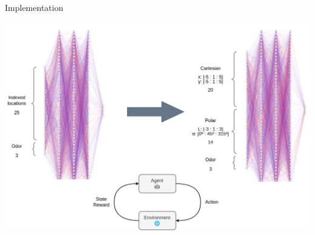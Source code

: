 \documentclass[bigger]{beamer}
\begin{document}
\begin{frame}[label={sec:org934d203}]{Implementation}
\begin{center}
\includegraphics[width=.9\linewidth]{img/nn.drawio.png}
\end{center}
\end{frame}
\end{document}
